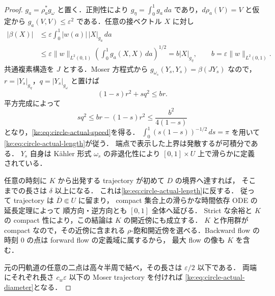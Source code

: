 \begin{proof}
$g_a=\rho_a^*g_\omega$ と置く．正則性により
$g_\eta=\int_0^1g_a\,da$ であり，$d\rho_a(V)=V$ と仮定から
$g_a(V,V)\le\varepsilon^2$ である．任意の接ベクトル $X$ に対し
\begin{align*}
 |\beta(X)|
 &\le\varepsilon\int_0^1 |w(a)|\,|X|_{g_a}\,da\\
 &\le\varepsilon\|w\|_{L^2(0,1)}
       \left(\int_0^1g_a(X,X)\,da\right)^{1/2}
 =b|X|_{g_\eta},\qquad b=\varepsilon\|w\|_{L^2(0,1)}.
\end{align*}
共通複素構造を $J$ とする．Moser 方程式から
$g_{\omega_s}(Y_s,Y_s)=\beta(JY_s)$ なので，
$r=|Y_s|_{g_\eta}$，$q=|Y_s|_{g_\omega}$ と置けば
\[
 (1-s)r^2+s q^2\le br.
\]
平方完成によって
\[
 s q^2\le br-(1-s)r^2\le\frac{b^2}{4(1-s)}
\]
となり，\eqref{ke:eq:circle-actual-speed}を得る．
$\int_0^1(s(1-s))^{-1/2}\,ds=\pi$ を用いて
\eqref{ke:eq:circle-actual-length}が従う．
端点で表示した上界は発散するが可積分である．
$Y_s$ 自身は K\"ahler 形式 $\omega_s$ の非退化性により
$[0,1]\times U$ 上で滑らかに定義されている．

任意の時刻に $K$ から出発する trajectory が初めて $D$ の境界へ達すれば，
そこまでの長さは $\delta$ 以上になる．
これは\eqref{ke:eq:circle-actual-length}に反する．
従って trajectory は $\overline D\Subset U$ に留まり，
compact 集合上の滑らかな時間依存 ODE の延長定理によって
順方向・逆方向とも $[0,1]$ 全体へ延びる．
Strict な余裕と $K$ の compact 性により，この結論は $K$ の開近傍にも成立する．
$K$ と作用群が compact なので，その近傍に含まれる
$\rho$-飽和開近傍を選べる．Backward flow の時刻 $0$ の点は forward flow の定義域に属するから，
最大 flow の像も $K$ を含む．

元の円軌道の任意の二点は高々半周で結べ，その長さは $\varepsilon/2$ 以下である．
両端にそれぞれ長さ $c_w\varepsilon$ 以下の Moser trajectory を付ければ
\eqref{ke:eq:circle-actual-diameter}となる．
\end{proof}

